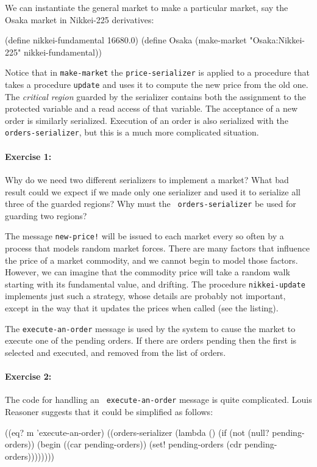 We can instantiate the general market to make a particular market, say
the Osaka market in Nikkei-225 derivatives:

\beginlisp
(define nikkei-fundamental 16680.0)
\null
(define Osaka
  (make-market "Osaka:Nikkei-225" nikkei-fundamental))
\endlisp

Notice that in {\tt make-market} the {\tt price-serializer} is applied
to a procedure that takes a procedure {\tt update} and uses it to
compute the new price from the old one.  The {\em critical region}
guarded by the serializer contains both the assignment to the
protected variable and a read access of that variable.  The acceptance
of a new order is similarly serialized.  Execution of an order is also
serialized with the {\tt orders-serializer}, but this is a much more
complicated situation.  

\paragraph{Exercise 1:}
Why do we need two different serializers to implement a market?  What
bad result could we expect if we made only one serializer and used it
to serialize all three of the guarded regions?  Why must the {\tt
orders-serializer} be used for guarding two regions?

The message {\tt new-price!} will be issued to each market every so
often by a process that models random market forces.  There are many
factors that influence the price of a market commodity, and we cannot
begin to model those factors.  However, we can imagine that the
commodity price will take a random walk starting with its fundamental
value, and drifting.  The procedure {\tt nikkei-update} implements
just such a strategy, whose details are probably not important, except
in the way that it updates the prices when called (see the listing).

The {\tt execute-an-order} message is used by the system to cause the
market to execute one of the pending orders.  If there are orders
pending then the first is selected and executed, and removed from the
list of orders.

\paragraph{Exercise 2:}
The code for handling an {\tt
execute-an-order} message is quite complicated.  Louis Reasoner
suggests that it could be simplified as follows:

\beginlisp
     ((eq? m 'execute-an-order)
      ((orders-serializer
        (lambda ()
          (if (not (null? pending-orders))
              (begin ((car pending-orders))
                     (set! pending-orders (cdr pending-orders))))))))
\endlisp

